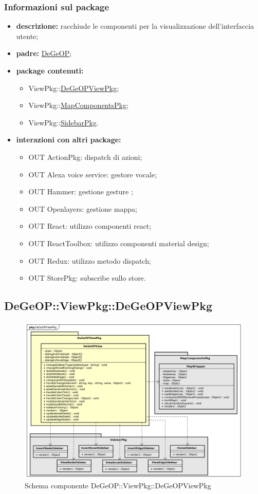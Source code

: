 \subsubsection{Informazioni sul package}
\begin{itemize}
	\item \textbf{descrizione:} racchiude le componenti per la visualizzazione dell'interfaccia utente;
	\item \textbf{padre:} \hyperref[pkg::DeGeOP]{DeGeOP};
	\item \textbf{package contenuti:}
	\begin{itemize}
		\item ViewPkg::\hyperref[pkg::DeGeOPViewPkg]{DeGeOPViewPkg};
		\item ViewPkg::\hyperref[pkg::MapComponentsPkg]{MapComponentsPkg};
		\item ViewPkg::\hyperref[pkg::SidebarPkg]{SidebarPkg}.
	\end{itemize}
	\item \textbf{interazioni con altri package:} 
	\begin{itemize}
		\item OUT ActionPkg: dispatch di azioni;
		\item OUT Alexa voice service: gestore vocale;
		\item OUT Hammer: gestione gesture ;
		\item OUT Openlayers: gestione mappa;
		\item OUT React: utilizzo componenti react;
		\item OUT ReactToolbox: utilizzo componenti material design;
		\item OUT Redux: utilizzo metodo dispatch;
		\item OUT StorePkg: subscribe sullo store.
	\end{itemize}
\end{itemize}
\newpage
\subsection{DeGeOP::ViewPkg::DeGeOPViewPkg}
\label{pkg::DeGeOPViewPkg}
\begin{figure}[H]
	\centering
	\includegraphics[width=\textwidth]{img/PkgDiagram/DeGeOPViewPkg.png}
	\caption{Schema componente DeGeOP::ViewPkg::DeGeOPViewPkg}
\end{figure}
